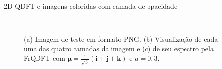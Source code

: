 \documentclass[10pt,compress]{beamer}
\newcommand{\qi}{\boldsymbol{i}}
\newcommand{\qj}{\boldsymbol{j}}
\newcommand{\qk}{\boldsymbol{k}}
\newcommand{\qmu}{\boldsymbol{\mu}}
\begin{document}
\begin{frame}{2D-QDFT e imagens coloridas com camada de opacidade}
\begin{figure}
\centering
{}~
~
~
\caption{(a) Imagem de teste em formato PNG. (b) Visualiza\c c\~ao de cada uma das quatro camadas da imagem e (c) de seu espectro pela FrQDFT com $ \qmu = \frac{1}{\sqrt{3}}(\qi + \qj + \qk) $ e $ a=0{,}3 $.}
\end{figure}
\end{frame}
\end{document}
